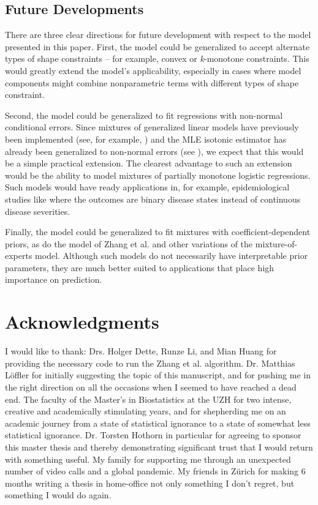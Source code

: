 \documentclass[10pt]{olplainarticle}\usepackage[]{graphicx}\usepackage[]{color}
\begin{document}
\subsection{Future Developments}

There are three clear directions for future development with respect to the model presented in this paper. First, the model could be generalized to accept alternate types of shape constraints -- for example, convex or \emph{k}-monotone constraints. This would greatly extend the model's applicability, especially in cases where model components might combine nonparametric terms with different types of shape constraint.

Second, the model could be generalized to fit regressions with non-normal conditional errors. Since mixtures of generalized linear models have previously been implemented (see, for example, \cite{mixglms}) and the MLE isotonic estimator has already been generalized to non-normal errors (see \cite{genpava}), we expect that this would be a simple practical extension. The clearest advantage to such an extension would be the ability to model mixtures of partially monotone logistic regressions. Such models would have ready applications in, for example, epidemiological studies like \cite{morton} where the outcomes are binary disease states instead of continuous disease severities. 

Finally, the model could be generalized to fit mixtures with coefficient-dependent priors, as do the model of Zhang et al. and other variations of the mixture-of-experts model. Although such models do not necessarily have interpretable prior parameters, they are much better suited to applications that place high importance on prediction.



\section*{Acknowledgments}

I would like to thank: Drs. Holger Dette, Runze Li, and Mian Huang for providing the necessary code to run the Zhang et al. algorithm. Dr. Matthias L{\"o}ffler for initially suggesting the topic of this manuscript, and for pushing me in the right direction on all the occasions when I seemed to have reached a dead end. The faculty of the Master's in Biostatistics at the UZH for two intense, creative and academically stimulating years, and for shepherding me on an academic journey from a state of statistical ignorance to a state of somewhat less statistical ignorance. Dr. Torsten Hothorn in particular for agreeing to sponsor this master thesis and thereby demonstrating significant trust that I would return with something useful. My family for supporting me through an unexpected number of video calls and a global pandemic. My friends in Z{\"u}rich for making 6 months writing a thesis in home-office not only something I don't regret, but something I would do again.
\end{document}
